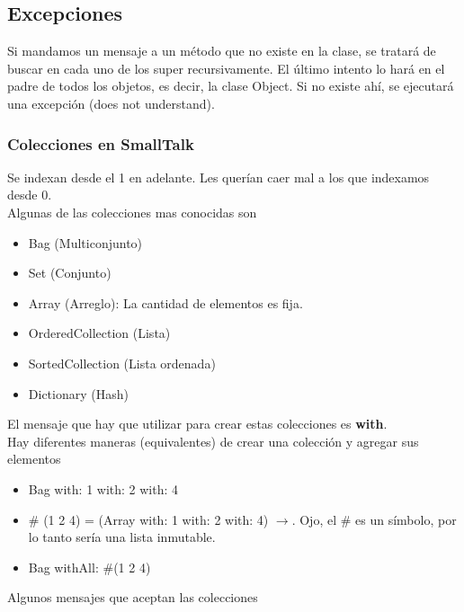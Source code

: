 \documentclass[10pt,a4paper]{article}
\begin{document}
\subsection*{Excepciones}
Si mandamos un mensaje a un método que no existe en la clase, se tratará de buscar en cada uno de los super recursivamente. El último intento lo hará en el padre de todos los objetos, es decir, la clase Object. Si no existe ahí, se ejecutará una excepción (does not understand).
\subsubsection*{Colecciones en SmallTalk}
Se indexan desde el 1 en adelante. Les querían caer mal a los que indexamos desde 0. \\
Algunas de las colecciones mas conocidas son 
\begin{itemize}
    \item Bag (Multiconjunto)
    \item Set (Conjunto)
    \item Array (Arreglo): La cantidad de elementos es fija. 
    \item OrderedCollection (Lista)
    \item SortedCollection (Lista ordenada)
    \item Dictionary (Hash)
\end{itemize}
El mensaje que hay que utilizar para crear estas colecciones es \textbf{with}. \\
Hay diferentes maneras (equivalentes) de crear una colección y agregar sus elementos
\begin{itemize}
    \item Bag with: 1 with: 2 with: 4
    \item $\#$ (1 2 4) = (Array with: 1 with: 2 with: 4) $\rightarrow$. Ojo, el $\#$ es un símbolo, por lo tanto sería una lista inmutable.
    \item Bag withAll: $\#$(1 2 4)
\end{itemize}
Algunos mensajes que aceptan las colecciones
\end{document}
